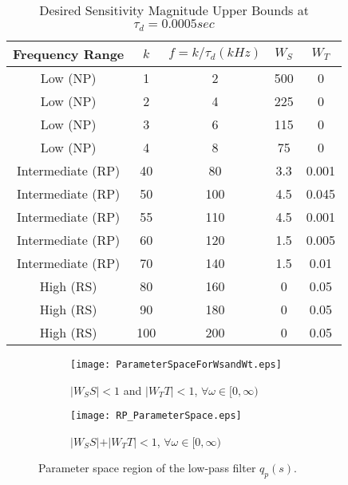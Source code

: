 \documentclass[12pt,draftcls,onecolumn]{IEEEtran}
\begin{document}
\begin{table}[!t]
\renewcommand{\arraystretch}{1.3}
\caption{Desired Sensitivity Magnitude Upper Bounds at
$\tau_{d}=0.0005sec$} \label{table_example} \centering
\begin{tabular}{c||c||c||c||c}
\hline
\bfseries Frequency Range & \bfseries $k$ & \bfseries $f=k/\tau_{d}(kHz)$ & $W_{S}$ & $W_{T}$\\
\hline\hline
Low (NP) & 1 & 2 & 500 & 0\\
\hline
Low (NP) & 2 & 4 & 225 & 0\\
\hline
Low (NP) & 3 & 6 & 115 & 0\\
\hline
Low (NP) & 4 & 8 &  75 & 0\\
\hline
Intermediate (RP) & 40 &  80 & 3.3 & 0.001\\
\hline
Intermediate (RP) & 50 & 100 & 4.5 & 0.045\\
\hline
Intermediate (RP) & 55 & 110 & 4.5 & 0.001\\
\hline
Intermediate (RP) & 60 & 120 & 1.5 & 0.005\\
\hline
Intermediate (RP) & 70 & 140 & 1.5 &  0.01\\
\hline
High (RS) &  80 & 160 & 0 & 0.05\\
\hline
High (RS) &  90 & 180 & 0 & 0.05\\
\hline
High (RS) & 100 & 200 & 0 & 0.05\\
\hline
\end{tabular}
\end{table}


\begin{figure}
        \centering
        \begin{subfigure}[b]{0.5\textwidth}
                \texttt{[image: ParameterSpaceForWsandWt.eps]}
                \caption{$\vert W_{S}S \vert <1$ and $\vert W_{T}T \vert <1$, $\forall\omega\in [0,\infty )$}
                \label{fig:gull}
        \end{subfigure}\begin{subfigure}[b]{0.5\textwidth}
                \texttt{[image: RP\_ParameterSpace.eps]}
                \caption{$\vert W_{S}S \vert + \vert W_{T}T \vert <1$, $\forall\omega\in [0,\infty )$}
                \label{fig:tiger}
        \end{subfigure}
        \caption{Parameter space region of the low-pass filter $q_{p}(s)$.}\label{fig:animals}
\end{figure}
\end{document}
